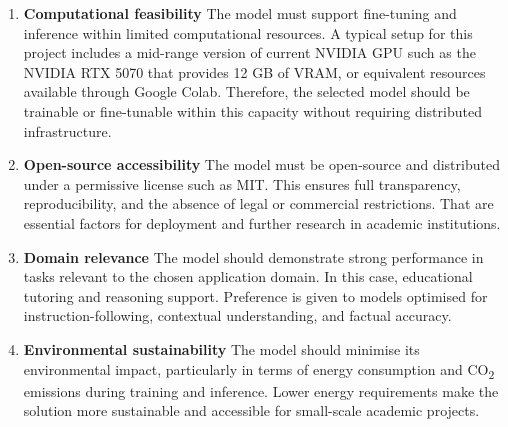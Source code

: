 \begin{enumerate}
    \item \textbf{Computational feasibility}  
    The model must support fine-tuning and inference within limited computational resources. A typical setup for this project includes a mid-range version of current NVIDIA GPU such as the NVIDIA RTX 5070  that provides 12 GB of VRAM, or equivalent resources available through Google Colab. Therefore, the selected model should be trainable or fine-tunable within this capacity without requiring distributed infrastructure.
    
    \item \textbf{Open-source accessibility}  
    The model must be open-source and distributed under a permissive license such as MIT. This ensures full transparency, reproducibility, and the absence of legal or commercial restrictions. That are essential factors for deployment and further research in academic institutions.
    
    \item \textbf{Domain relevance}  
    The model should demonstrate strong performance in tasks relevant to the chosen application domain. In this case, educational tutoring and reasoning support. Preference is given to models optimised for instruction-following, contextual understanding, and factual accuracy.
    
    \item \textbf{Environmental sustainability}  
    The model should minimise its environmental impact, particularly in terms of energy consumption and CO\textsubscript{2} emissions during training and inference. Lower energy requirements make the solution more sustainable and accessible for small-scale academic projects.
\end{enumerate}

